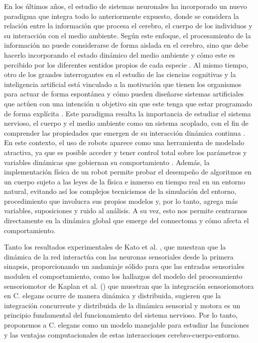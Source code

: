En los últimos años, el estudio de sistemas neuronales ha incorporado un nuevo paradigma que integra todo lo anteriormente expuesto, donde se considera la relación entre la información que procesa el cerebro, el cuerpo de los individuos y su interacción con el medio ambiente. Según este enfoque, el procesamiento de la información no puede considerarse de forma aislada en el cerebro, sino que debe hacerlo incorporando el estado dinámico del medio ambiente y cómo este es percibido por los diferentes sentidos propios de cada especie \cite{der_playful_2012}. Al mismo tiempo, otro de los grandes interrogantes en el estudio de las ciencias cognitivas y la inteligencia artificial está vinculado a la motivación que tienen los organismos para actuar de forma espontánea y cómo pueden diseñarse sistemas artificiales que actúen con una intención u objetivo sin que este tenga que estar programado de forma explícita \cite{brembs_towards_2010}.   Este paradigma resalta la importancia de estudiar el sistema nervioso, el cuerpo y el medio ambiente como un sistema acoplado, con el fin de comprender las propiedades que emergen de su interacción dinámica continua \cite{webb_robots_2002, floreano_robotics_2014}.  En este contexto, el uso de robots aparece como una herramienta de modelado atractiva, ya que es posible acceder y tener control total sobre los parámetros y variables dinámicas que gobiernan su comportamiento \cite{pfeifer_self-organization_2007}. Además, la implementación física de un robot permite probar el desempeño de algoritmos en un cuerpo sujeto a las leyes de la física e inmerso en tiempo real en un entorno natural, evitando así los complejos tecnicismos de la simulación del entorno, procedimiento que involucra sus propios modelos y, por lo tanto, agrega más variables, suposiciones y ruido al análisis. A su vez, esto nos permite centrarnos directamente en la dinámica global que emerge del connectoma y cómo afecta el comportamiento.


Tanto los resultados experimentales de Kato et al. \cite{kato_global_2015}, que muestran que la dinámica de la red interactúa con las neuronas sensoriales desde la primera sinapsis, proporcionando un andamiaje sólido para que las entradas sensoriales modulen el comportamiento, como los hallazgos del modelo del procesamiento sensoriomotor de Kaplan et al. \cite{kaplan_sensorimotor_2018}() que muestran que la integración sensoriomotora en C. elegans ocurre de manera dinámica y distribuida, sugieren que la integración concurrente y distribuida de la dinámica sensorial y motora es un principio fundamental del funcionamiento del sistema nervioso. Por lo tanto, proponemos a C. elegans como un modelo manejable para estudiar las funciones y las ventajas computacionales de estas interacciones cerebro-cuerpo-entorno.

